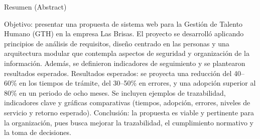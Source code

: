 Resumen (Abstract)

Objetivo: presentar una propuesta de sistema web para la Gestión de Talento Humano (GTH) en la empresa Las Brisas. El proyecto se desarrolló aplicando principios de análisis de requisitos, diseño centrado en las personas y una arquitectura modular que contempla aspectos de seguridad y organización de la información. Además, se definieron indicadores de seguimiento y se plantearon resultados esperados. Resultados esperados: se proyecta una reducción del 40–60\% en los tiempos de trámite, del 30–50\% en errores, y una adopción superior al 80\% en un periodo de ocho meses. Se incluyen ejemplos de trazabilidad, indicadores clave y gráficas comparativas (tiempos, adopción, errores, niveles de servicio y retorno esperado). Conclusión: la propuesta es viable y pertinente para la organización, pues busca mejorar la trazabilidad, el cumplimiento normativo y la toma de decisiones.